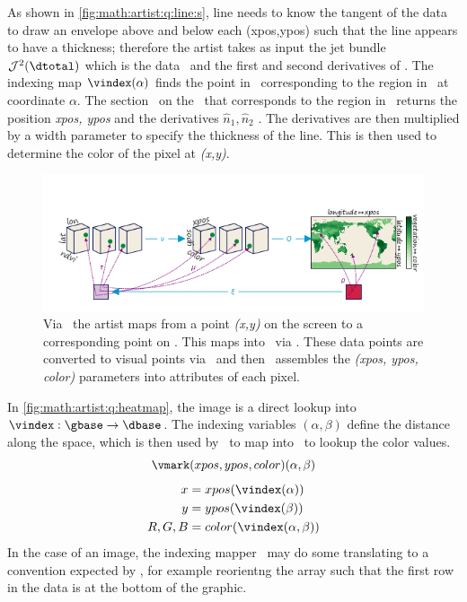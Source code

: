 \documentclass[../main.tex]{subfiles}
\begin{document}
As shown in \autoref{fig:math:artist:q:line:s}, line needs to know the tangent of the data to draw an envelope above and below each (xpos,ypos) such that the line appears to have a thickness; therefore the artist takes as input the jet bundle \cite{JetBundle2020,musilovaCalculusVariationsJet2016} $\mathcal{J}^{2}(\dtotal)$ which is the data \dtotal\ and the first and second derivatives of \dtotal. The indexing map $\vindex(\alpha)$ finds the point in \dbase\ corresponding to the region in \gbase\ at coordinate $\alpha$. The section \dsection\ on the \dbasepoint\ that corresponds to the region in \gbase\ returns the position \textit{xpos, ypos} and the derivatives $\hat{n}_1, \hat{n}_2$ . The derivatives are then multiplied by a width parameter to specify the thickness of the line. This is then used to determine the color of the pixel at \textit{(x,y)}.  

\begin{figure}[H]
    \includegraphics[width=\textwidth]{figures/math/image.png}
    \caption{Via \vindex\, the artist maps from a point \textit{(x,y)} on the screen to a corresponding point on \dbase. This maps into \dfiber\ via \dsection. These data points are converted to visual points via \vchannel\, and then \vmark\ assembles the \textit{(xpos, ypos, color)} parameters into attributes of each pixel. }
    \label{fig:math:artist:q:heatmap}
\end{figure}
In \autoref{fig:math:artist:q:heatmap}, the image is a direct lookup into  $\vindex:\gbase\rightarrow\dbase$. The indexing variables $(\alpha, \beta)$ define the distance along the space, which is then used by \vindex\ to map into \dbase\ to lookup the color values.
\begin{equation}
    \vmark(xpos, ypos, color)(\alpha, \beta)
    \label{eq:math:artist:q:image}
    \end{equation}
\begin{align*}
x &= xpos(\vindex(\alpha))\\
y &= ypos(\vindex(\beta))\\
R, G, B &= color(\vindex(\alpha, \beta))
\end{align*}
In the case of an image, the indexing mapper \vindex\ may do some translating to a convention expected by \vmark, for example reorientng the array such that the first row in the data is at the bottom of the graphic. 
\end{document}
